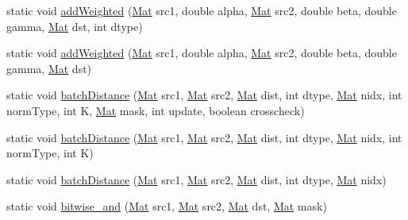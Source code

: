 \begin{DoxyCompactItemize}
\item 
static void \mbox{\hyperlink{classorg_1_1opencv_1_1core_1_1_core_add4de9ffbc90262f78aa239a0907c73f}{add\+Weighted}} (\mbox{\hyperlink{classorg_1_1opencv_1_1core_1_1_mat}{Mat}} src1, double alpha, \mbox{\hyperlink{classorg_1_1opencv_1_1core_1_1_mat}{Mat}} src2, double beta, double gamma, \mbox{\hyperlink{classorg_1_1opencv_1_1core_1_1_mat}{Mat}} dst, int dtype)
\item 
static void \mbox{\hyperlink{classorg_1_1opencv_1_1core_1_1_core_ab74a2a59f0becfed354284b235437050}{add\+Weighted}} (\mbox{\hyperlink{classorg_1_1opencv_1_1core_1_1_mat}{Mat}} src1, double alpha, \mbox{\hyperlink{classorg_1_1opencv_1_1core_1_1_mat}{Mat}} src2, double beta, double gamma, \mbox{\hyperlink{classorg_1_1opencv_1_1core_1_1_mat}{Mat}} dst)
\item 
static void \mbox{\hyperlink{classorg_1_1opencv_1_1core_1_1_core_a70d45a1c21c5423a1539f795ea58654d}{batch\+Distance}} (\mbox{\hyperlink{classorg_1_1opencv_1_1core_1_1_mat}{Mat}} src1, \mbox{\hyperlink{classorg_1_1opencv_1_1core_1_1_mat}{Mat}} src2, \mbox{\hyperlink{classorg_1_1opencv_1_1core_1_1_mat}{Mat}} dist, int dtype, \mbox{\hyperlink{classorg_1_1opencv_1_1core_1_1_mat}{Mat}} nidx, int norm\+Type, int K, \mbox{\hyperlink{classorg_1_1opencv_1_1core_1_1_mat}{Mat}} mask, int update, boolean crosscheck)
\item 
static void \mbox{\hyperlink{classorg_1_1opencv_1_1core_1_1_core_a1a20f1a6cd9f3fb0278657f1c9fe22bb}{batch\+Distance}} (\mbox{\hyperlink{classorg_1_1opencv_1_1core_1_1_mat}{Mat}} src1, \mbox{\hyperlink{classorg_1_1opencv_1_1core_1_1_mat}{Mat}} src2, \mbox{\hyperlink{classorg_1_1opencv_1_1core_1_1_mat}{Mat}} dist, int dtype, \mbox{\hyperlink{classorg_1_1opencv_1_1core_1_1_mat}{Mat}} nidx, int norm\+Type, int K)
\item 
static void \mbox{\hyperlink{classorg_1_1opencv_1_1core_1_1_core_a316866023305882fb794af7a3db7299c}{batch\+Distance}} (\mbox{\hyperlink{classorg_1_1opencv_1_1core_1_1_mat}{Mat}} src1, \mbox{\hyperlink{classorg_1_1opencv_1_1core_1_1_mat}{Mat}} src2, \mbox{\hyperlink{classorg_1_1opencv_1_1core_1_1_mat}{Mat}} dist, int dtype, \mbox{\hyperlink{classorg_1_1opencv_1_1core_1_1_mat}{Mat}} nidx)
\item 
static void \mbox{\hyperlink{classorg_1_1opencv_1_1core_1_1_core_a848cb46acc8307c57896d9835e90f86c}{bitwise\+\_\+and}} (\mbox{\hyperlink{classorg_1_1opencv_1_1core_1_1_mat}{Mat}} src1, \mbox{\hyperlink{classorg_1_1opencv_1_1core_1_1_mat}{Mat}} src2, \mbox{\hyperlink{classorg_1_1opencv_1_1core_1_1_mat}{Mat}} dst, \mbox{\hyperlink{classorg_1_1opencv_1_1core_1_1_mat}{Mat}} mask)

\end{DoxyCompactItemize}
